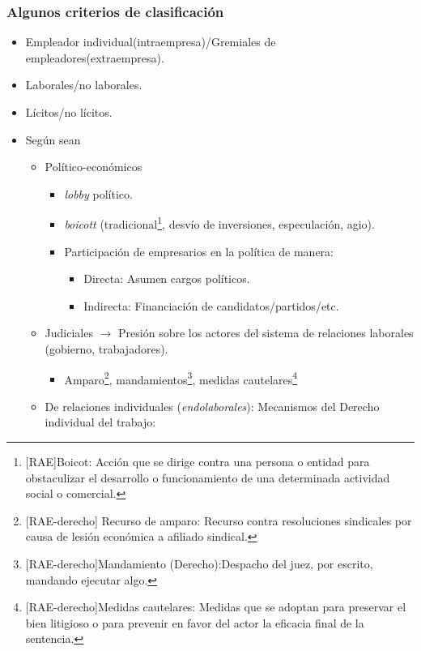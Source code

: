 \documentclass[spanish,12pt,a4paper,titlepage]{report}
\begin{document}
\subsubsection{Algunos criterios de clasificación}
\label{sec:Algunos-criterios-de-clasificacion}

\begin{itemize}
\item Empleador individual(intraempresa)/Gremiales de empleadores(extraempresa).
\item Laborales/no laborales.
\item Lícitos/no lícitos.
\item Según sean
  \begin{itemize}
  \item Político-económicos
    \begin{itemize}
    \item \textit{lobby} político.
    \item \textit{boicott} (tradicional\footnote{[RAE]Boicot: Acción que se dirige contra una persona o entidad para obstaculizar el desarrollo o funcionamiento de una determinada actividad social o comercial.}, desvío de inversiones, especulación, agio).
    \item Participación de empresarios en la política de manera:
      \begin{itemize}
      \item Directa: Asumen cargos políticos.
      \item Indirecta: Financiación de candidatos/partidos/etc.
      \end{itemize}
    \end{itemize}
  \item Judiciales $\rightarrow$ Presión sobre los actores del sistema de relaciones laborales (gobierno, trabajadores).
    \begin{itemize}
    \item Amparo\footnote{[RAE-derecho] Recurso de amparo: Recurso contra resoluciones sindicales por causa de lesión económica a afiliado sindical.}, mandamientos\footnote{[RAE-derecho]Mandamiento (Derecho):Despacho del juez, por escrito, mandando ejecutar algo.}, medidas cautelares\footnote{[RAE-derecho]Medidas cautelares: Medidas que se adoptan para preservar el bien litigioso o para prevenir en favor del actor la eficacia final de la sentencia.}
    \end{itemize}
  \item De relaciones individuales (\textit{endolaborales}): Mecanismos del Derecho individual del trabajo:

\end{itemize}
\end{itemize}
\end{document}
